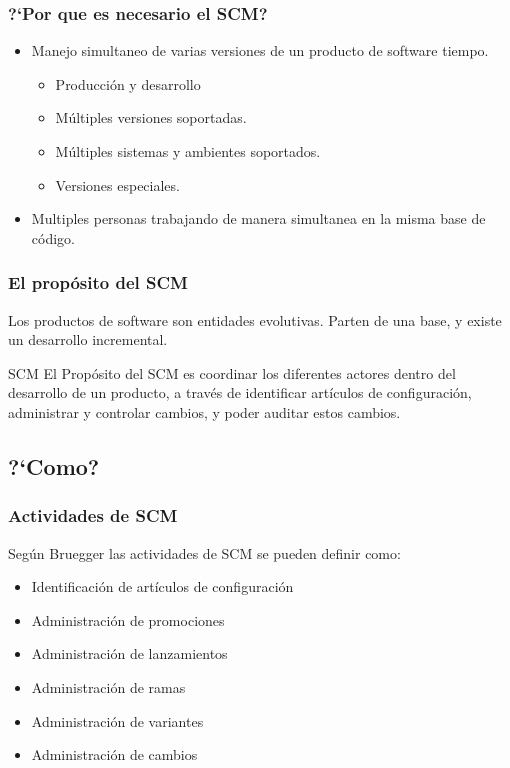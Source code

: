 \begin{frame}
\frametitle{?`Por que es necesario el SCM?}
\begin{itemize}
  \item Manejo simultaneo de varias versiones de un producto de software
  tiempo.
  \begin{itemize}
    \item Producci\'on y desarrollo
    \item M\'ultiples versiones soportadas.
    \item M\'ultiples sistemas y ambientes soportados. 
    \item Versiones especiales. 
  \end{itemize}
  \item Multiples personas trabajando de manera simultanea en la misma base de
  c\'odigo. 
\end{itemize}
\end{frame} 

\begin{frame}
\frametitle{El prop\'osito del SCM}
Los productos de software son entidades evolutivas. Parten de una base, y existe
un desarrollo incremental. 
\begin{block}{SCM}
El Prop\'osito del SCM es coordinar los diferentes actores dentro del desarrollo
de un producto, a trav\'es de identificar art\'iculos de configuraci\'on,
administrar y controlar cambios, y poder auditar estos cambios.
\end{block}
\end{frame}

\subsection{?`Como?}
\begin{frame}
\frametitle{Actividades de SCM}
Seg\'un Bruegger las actividades de SCM se pueden definir como: 
\begin{itemize}
  \item Identificaci\'on de art\'iculos de configuraci\'on
  \item Administraci\'on de promociones
  \item Administraci\'on de lanzamientos
  \item Administraci\'on de ramas
  \item Administraci\'on de variantes
  \item Administraci\'on de cambios
\end{itemize}
\end{frame}

